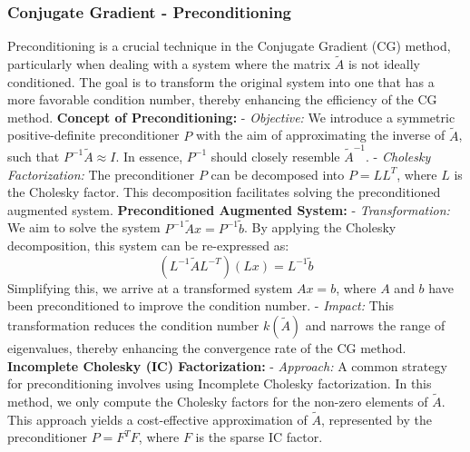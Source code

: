 \documentclass[unicode,11pt,a4paper,oneside,numbers=endperiod,openany]{scrartcl}
\begin{document}
\subsubsection{Conjugate Gradient - Preconditioning}
Preconditioning is a crucial technique in the Conjugate Gradient (CG) method, particularly when dealing with a system where the matrix \( \tilde{A} \) is not ideally conditioned. The goal is to transform the original system into one that has a more favorable condition number, thereby enhancing the efficiency of the CG method.
\newline\newline
\textbf{Concept of Preconditioning:}\newline\newline
- \textit{Objective:} We introduce a symmetric positive-definite preconditioner \( P \) with the aim of approximating the inverse of \( \tilde{A} \), such that \( P^{-1}\tilde{A} \approx I \). In essence, \( P^{-1} \) should closely resemble \( \tilde{A}^{-1} \).\newline\newline
- \textit{Cholesky Factorization:} The preconditioner \( P \) can be decomposed into \( P = LL^T \), where \( L \) is the Cholesky factor. This decomposition facilitates solving the preconditioned augmented system.
\newline\newline
\textbf{Preconditioned Augmented System:}\newline\newline
- \textit{Transformation:} We aim to solve the system \( P^{-1}\tilde{A}x = P^{-1}\tilde{b} \). By applying the Cholesky decomposition, this system can be re-expressed as:
  \[
  (L^{-1}\tilde{A}L^{-T})(Lx) = L^{-1}\tilde{b}
  \]
  Simplifying this, we arrive at a transformed system \( Ax = b \), where \( A \) and \( b \) have been preconditioned to improve the condition number.
- \textit{Impact:} This transformation reduces the condition number \( k(\tilde{A}) \) and narrows the range of eigenvalues, thereby enhancing the convergence rate of the CG method.
\newline\newline
\textbf{Incomplete Cholesky (IC) Factorization:}
- \textit{Approach:} A common strategy for preconditioning involves using Incomplete Cholesky factorization. In this method, we only compute the Cholesky factors for the non-zero elements of \( \tilde{A} \). This approach yields a cost-effective approximation of \( \tilde{A} \), represented by the preconditioner \( P = F^TF \), where \( F \) is the sparse IC factor.\newline\newline
\end{document}
